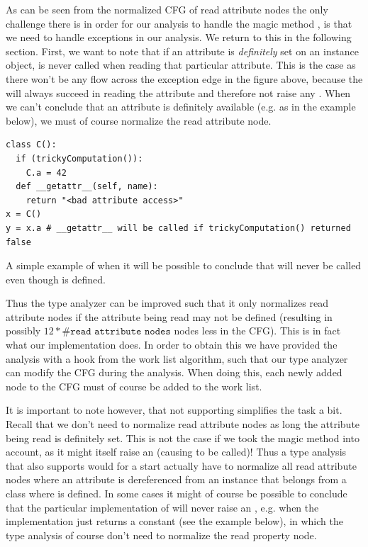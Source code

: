 As can be seen from the normalized CFG of read attribute nodes the only challenge there is in order for our analysis to handle the magic method , is that we need to handle exceptions in our analysis. We return to this in the following section. First, we want to note that if an attribute is \textit{definitely} set on an instance object,  is never called when reading that particular attribute. This is the case as there won't be any flow across the exception edge in the figure above, because the  will always succeed in reading the attribute and therefore not raise any . When we can't conclude that an attribute is definitely available (e.g. as in the example below), we must of course normalize the read attribute node.

\begin{listing}[H]
  \begin{verbatim}
class C():
  if (trickyComputation()):
    C.a = 42
  def __getattr__(self, name):
    return "<bad attribute access>"
x = C()
y = x.a # __getattr__ will be called if trickyComputation() returned false
  \end{verbatim}
  \caption{A simple example of when it will be possible to conclude that  will never be called even though  is defined.}
  \label{code:MagicMethods2}
\end{listing}

Thus the type analyzer can be improved such that it only normalizes read attribute nodes if the attribute being read may not be defined (resulting in possibly $12 * \#\texttt{read attribute nodes}$ nodes less in the CFG). This is in fact what our implementation does. In order to obtain this we have provided the analysis with a hook from the work list algorithm, such that our type analyzer can modify the CFG during the analysis. When doing this, each newly added node to the CFG must of course be added to the work list.

It is important to note however, that not supporting  simplifies the task a bit. Recall that we don't need to normalize read attribute nodes as long the attribute being read is definitely set. This is not the case if we took the magic method  into account, as it might itself raise an  (causing  to be called)! Thus a type analysis that also supports  would for a start actually have to normalize all read attribute nodes where an attribute is dereferenced from an instance that belongs from a class where  is defined. In some cases it might of course be possible to conclude that the particular implementation of  will never raise an , e.g. when the implementation just returns a constant (see the example below), in which the type analysis of course don't need to normalize the read property node.

